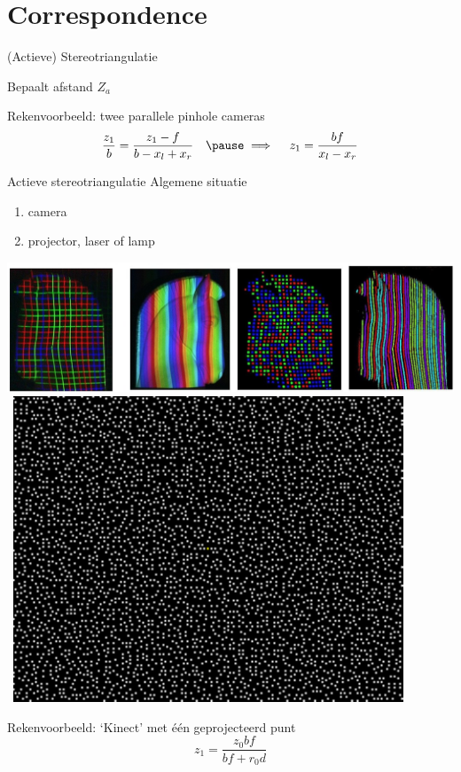 \section{Correspondence}
\begin{frame}{(Actieve) Stereotriangulatie}

{\large Bepaalt afstand $Z_a$}

\centerline{}
\vfill
\pause
{\large Rekenvoorbeeld: twee parallele pinhole cameras}
\pause
$$
\frac{z_1}{b} = \frac{z_1 - f}{b-x_l+x_r}\quad \pause\implies\quad z_1 = \frac {bf} {x_l - x_r}
$$
\end{frame}

\begin{frame}{Actieve stereotriangulatie}{}
{\large Algemene situatie}
\begin{enumerate}
\item camera
\item projector, laser of lamp
\end{enumerate}
\vfill
\pause
\centerline{\includegraphics[scale=0.17]{structuredlight.jpg}\, \includegraphics[scale=1, clip=true, viewport= 0 0 80 63]{kinect-pattern}}
\vfill
\pause
{\large Rekenvoorbeeld: `Kinect' met \'e\'en geprojecteerd punt}
\pause
$$
z_1 = \frac {z_0bf}{bf + r_0d}
$$
\end{frame}

